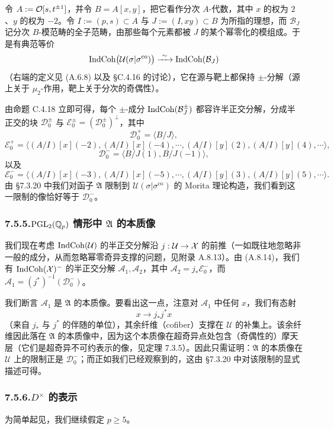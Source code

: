 令 $A:=\mathcal{O}[s,t^{\pm1}]$，并令 $B=A[x,y]$，把它看作分次 $A$-代数，其中 $x$ 的权为 $2$、$y$ 的权为 $-2$。令 $I:=(p,s)\subset A$ 与 $J:=(I,xy)\subset B$ 为所指的理想，而 $\mathcal B_J$ 记分次 $B$-模范畴的全子范畴，由那些每个元素都被 $J$ 的某个幂零化的模组成。于是有典范等价
\[
\operatorname{IndCoh}\bigl(\mathcal U(\sigma|\sigma^{\mathrm{co}})\bigr)\xrightarrow{\ \sim\ }\operatorname{IndCoh}(\mathcal B_J)
\]
（右端的定义见 (A.6.8) 以及 §C.4.16 的讨论），它在源与靶上都保持 $\pm$-分解（源上关于 $\mu_2$-作用，靶上关于分次的奇偶性）。

由命题 C.4.18 立即可得，每个 $\pm$-成分 $\operatorname{IndCoh}(\mathcal B_J^{\pm})$ 都容许半正交分解，分成半正交的块 $\mathcal D_0^{\pm}$ 与 $\mathcal E_0^{\pm}=(\mathcal D_0^{\pm})^{\perp}$，其中
\[
\mathcal D_0^{+}=\langle B/J\rangle,
\]
\[
\mathcal E_0^{+}=\bigl\langle(A/I)[x](-2),(A/I)[x](-4),\cdots,(A/I)[y](2),(A/I)[y](4),\cdots\bigr\rangle,
\]
\[
\mathcal D_0^{-}=\langle B/J(1),B/J(-1)\rangle,
\]
以及
\[
\mathcal E_0^{-}=\bigl\langle(A/I)[x](-3),(A/I)[x](-5),\cdots,(A/I)[y](3),(A/I)[y](5),\cdots\bigr\rangle.
\]
由 §7.3.20 中我们对函子 $\mathfrak A$ 限制到 $\mathcal U(\sigma|\sigma^{\mathrm{co}})$ 的 Morita 理论构造，我们看到这一限制的像恰好等于 $\mathcal D_0^{-}$。

\subsubsection*{7.5.5.\quad $\mathrm{PGL}_2(\mathbb{Q}_p)$ 情形中 $\mathfrak A$ 的本质像}
我们现在考虑 $\operatorname{IndCoh}(\mathcal U)$ 的半正交分解沿 $j:\mathcal U\to\mathcal{X}$ 的前推（一如既往地忽略非一般的成分，从而忽略幂零奇异支撑的问题，见附录 A.8.13）。由 (A.8.14)，我们有 $\operatorname{IndCoh}(\mathcal{X})^{-}$ 的半正交分解 $\mathcal A_1,\mathcal A_2$，其中 $\mathcal A_2=j_*\mathcal E_0^{-}$，而 $\mathcal A_1=(j^*)^{-1}(\mathcal D_0^{-})$。

我们断言 $\mathcal A_1$ 是 $\mathfrak A$ 的本质像。要看出这一点，注意对 $\mathcal A_1$ 中任何 $x$，我们有态射
\[
x\to j_*j^*x
\]
（来自 $j_*$ 与 $j^*$ 的伴随的单位），其余纤维（cofiber）支撑在 $\mathcal U$ 的补集上。该余纤维因此落在 $\mathfrak A$ 的本质像中，因为这个本质像在超奇异点处包含（奇偶性的）摩天层（它们是超奇异不可约表示的像，见定理 7.3.5）。因此只需证明：$\mathfrak A$ 的本质像在 $\mathcal U$ 上的限制正是 $\mathcal D_0^{-}$；而正如我们已经观察到的，这由 §7.3.20 中对该限制的显式描述可得。

\subsubsection*{7.5.6.\quad $D^\times$ 的表示}
为简单起见，我们继续假定 $p\ge5$。

